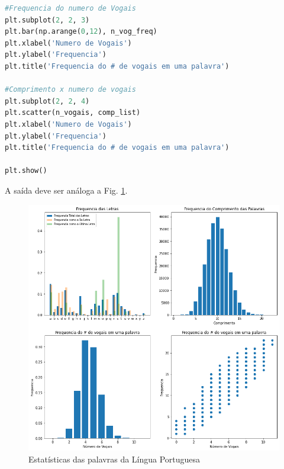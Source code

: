 \begin{lstlisting}[language=Python, frame=lines,basicstyle=\footnotesize, caption={Estatísticas das }, label={lst:isprime}]
#Frequencia do numero de Vogais
plt.subplot(2, 2, 3)
plt.bar(np.arange(0,12), n_vog_freq)
plt.xlabel('Numero de Vogais')
plt.ylabel('Frequencia')
plt.title('Frequencia do # de vogais em uma palavra')

#Comprimento x numero de vogais
plt.subplot(2, 2, 4)
plt.scatter(n_vogais, comp_list)
plt.xlabel('Numero de Vogais')
plt.ylabel('Frequencia')
plt.title('Frequencia do # de vogais em uma palavra')

plt.show()

\end{lstlisting}

A saída deve ser análoga a Fig. \ref{fig:letras}.

\begin{figure}[h!]
\centering
\includegraphics[scale=0.4]{Images/letras.png}
\caption{Estatísticas das palavras da Língua Portuguesa}\label{fig:letras}
\end{figure}



